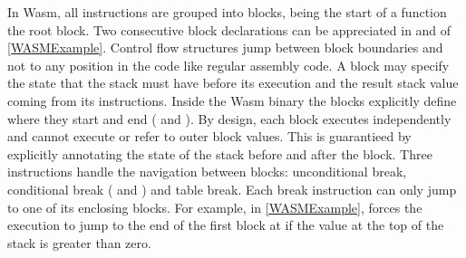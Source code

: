 In Wasm, all instructions are grouped into blocks, being the start of a function the root block. Two consecutive block declarations can be appreciated in  and  of \autoref{WASMExample}. Control flow structures jump between block boundaries and not to any position in the code like regular assembly code. A block may specify the state that the stack must have before its execution and the result stack value coming from its instructions. Inside the Wasm  binary the blocks explicitly define where they start and end ( and ). By design, each block executes independently and cannot execute or refer to outer block values. This is guarantieed by explicitly annotating the state of the stack before and after the block. Three instructions handle the navigation between blocks: unconditional break, conditional break ( and ) and table break. Each break instruction can only jump to one of its enclosing blocks. For example, in \autoref{WASMExample},  forces the execution to jump to the end of the first block at  if the value at the top of the stack is greater than zero.










